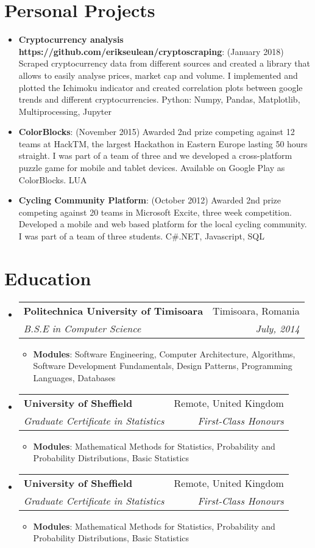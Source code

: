 \documentclass[letterpaper,11pt]{article}
\makeatletter
\newcommand{\resumeItem}[2]{
  \item\small{
    \textbf{#1}{: #2 \vspace{-1pt}}
  }
}
\newcommand{\resumeSubheading}[4]{
  \vspace{-1pt}\item
    \begin{tabular*}{0.97\textwidth}{l@{\extracolsep{\fill}}r}
      \textbf{#1} & #2 \\
      \textit{\small#3} & \textit{\small #4} \\
    \end{tabular*}\vspace{-5pt}
}
\newcommand{\resumeSubItem}[2]{\resumeItem{#1}{#2}\vspace{-5pt}}
\newcommand{\resumeSubHeadingListStart}{\begin{itemize}[leftmargin=*]}
\newcommand{\resumeSubHeadingListEnd}{\end{itemize}}
\newcommand{\resumeItemListStart}{\begin{itemize}}
\newcommand{\resumeItemListEnd}{\end{itemize}\vspace{-4.6pt}}
\makeatother
\begin{document}
\section{Personal Projects}
  \resumeSubHeadingListStart
    \resumeSubItem {Cryptocurrency analysis https://github.com/erikseulean/cryptoscraping}
    {(January 2018) Scraped cryptocurrency data from different sources and created a library that allows to easily analyse prices, market cap and volume. I implemented and plotted the Ichimoku indicator and created correlation plots between google trends and different cryptocurrencies. Python: Numpy, Pandas, Matplotlib, Multiprocessing, Jupyter}
    \resumeSubItem{ColorBlocks}
      {(November 2015) Awarded 2nd prize competing against 12 teams at HackTM, the largest Hackathon in Eastern Europe lasting 50 hours straight. I was part of a team of three and we developed a cross-platform puzzle game for mobile and tablet devices. Available on Google Play as ColorBlocks. LUA}
    \resumeSubItem{Cycling Community Platform}
    	{(October 2012) Awarded 2nd prize competing against 20 teams in Microsoft Excite, three week competition. Developed a mobile and web based platform for the local cycling community. I was part of a team of three students. C\#.NET, Javascript, SQL}
  \resumeSubHeadingListEnd


\section{Education}
  \resumeSubHeadingListStart
    \resumeSubheading
      {Politechnica University of Timisoara}{Timisoara, Romania}
      {B.S.E in Computer Science}{July, 2014}
    \resumeItemListStart
    	\resumeItem{Modules}
        {Software Engineering, Computer Architecture, Algorithms, Software Development Fundamentals, Design Patterns, Programming Languages, Databases}
    \resumeItemListEnd
    \resumeSubheading
      {University of Sheffield}{Remote, United Kingdom}
      {Graduate Certificate in Statistics}{First-Class Honours}
    \resumeItemListStart
    	\resumeItem{Modules}
        {Mathematical Methods for Statistics, Probability and Probability Distributions, Basic Statistics}
    \resumeItemListEnd
    \resumeSubheading
      {University of Sheffield}{Remote, United Kingdom}
      {Graduate Certificate in Statistics}{First-Class Honours}
    \resumeItemListStart
    	\resumeItem{Modules}
        {Mathematical Methods for Statistics, Probability and Probability Distributions, Basic Statistics}
    \resumeItemListEnd        
  \resumeSubHeadingListEnd
\end{document}
